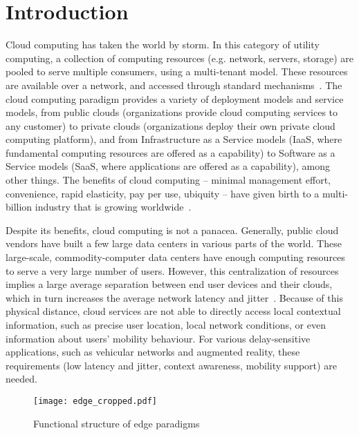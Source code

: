 \documentclass[twocolumn,preprint,3p]{elsarticle}
\begin{document}
\section{Introduction}
\label{intro}

Cloud computing has taken the world by storm. In this category of utility computing, a collection of computing resources (e.g. network, servers, storage) are pooled to serve multiple consumers, using a multi-tenant model. These resources are available over a network, and accessed through standard mechanisms~\cite{NISTCC2011}. The cloud computing paradigm provides a variety of deployment models and service models, from public clouds (organizations provide cloud computing services to any customer) to private clouds (organizations deploy their own private cloud computing platform), and from Infrastructure as a Service models (IaaS, where fundamental computing resources are offered as a capability) to Software as a Service models (SaaS, where applications are offered as a capability), among other things. The benefits of cloud computing --  minimal management effort, convenience, rapid elasticity, pay per use, ubiquity -- have given birth to a multi-billion industry that is growing worldwide~\cite{IDCCC2016}.

Despite its benefits, cloud computing is not a panacea. Generally, public cloud vendors have built a few large data centers in various parts of the world. These large-scale, commodity-computer data centers have enough computing resources to serve a very large number of users. However, this centralization of resources implies a large average separation between end user devices and their clouds, which in turn increases the average network latency and jitter~\cite{Satyanarayanan15}. Because of this physical distance, cloud services are not able to directly access local contextual information, such as precise user location, local network conditions, or even information about users' mobility behaviour. For various delay-sensitive applications, such as vehicular networks and augmented reality, these requirements (low latency and jitter, context awareness, mobility support) are needed.

\begin{figure*}
\centering
\texttt{[image: edge\_cropped.pdf]}
\caption{Functional structure of edge paradigms}
\label{fig:Edge}
\end{figure*}
\end{document}
